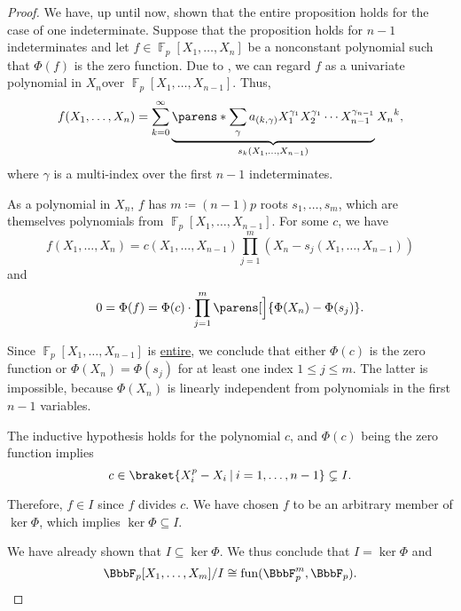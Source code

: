 \begin{proof}
  We have, up until now, shown that the entire proposition holds for the case of one indeterminate. Suppose that the proposition holds for \( n - 1 \) indeterminates and let \( f \in \BbbF_p[X_1, \ldots, X_n] \) be a nonconstant polynomial such that \( \Phi(f) \) is the zero function. Due to , we can regard \( f \) as a univariate polynomial in \( X_n \)over \( \BbbF_p[X_1, \ldots, X_{n-1}] \). Thus,
  \begin{equation*}
    f(X_1, \ldots, X_n) = \sum_{k =0}^\infty \underbrace{\parens*{ \sum_\gamma a_{(k,\gamma)} X_1^{\gamma_1} X_2^{\gamma_1} \cdots X_{n-1}^{\gamma_{n-1}} }}_{s_k(X_1, \ldots, X_{n-1})} {X_n}^k,
  \end{equation*}
  where \( \gamma \) is a multi-index over the first \( n - 1 \) indeterminates.

  As a polynomial in \( X_n \), \( f \) has \( m \coloneqq (n-1)p \) roots \( s_1, \ldots, s_m \), which are themselves polynomials from \( \BbbF_p[X_1, \ldots, X_{n-1}] \). For some \( c \), we have
  \begin{equation*}
    f(X_1, \ldots, X_n) = c(X_1, \ldots, X_{n-1}) \prod_{j=1}^m (X_n - s_j(X_1, \ldots, X_{n-1}))
  \end{equation*}
  and
  \begin{equation*}
    0 = \Phi(f) = \Phi(c) \cdot \prod_{j=1}^m \parens[\Big]{ \Phi(X_n) - \Phi(s_j) }.
  \end{equation*}

  Since \( \BbbF_p[X_1, \ldots, X_{n-1}] \) is \hyperref[def:entire_semiring]{entire}, we conclude that either \( \Phi(c) \) is the zero function or \( \Phi(X_n) = \Phi(s_j) \) for at least one index \( 1 \leq j \leq m \). The latter is impossible, because \( \Phi(X_n) \) is linearly independent from polynomials in the first \( n - 1 \) variables.

  The inductive hypothesis holds for the polynomial \( c \), and \( \Phi(c) \) being the zero function implies
  \begin{equation*}
    c \in \braket{ X_i^p - X_i \given i = 1, \ldots, n - 1 } \subsetneq I.
  \end{equation*}

  Therefore, \( f \in I \) since \( f \) divides \( c \). We have chosen \( f \) to be an arbitrary member of \( \ker \Phi \), which implies \( \ker \Phi \subseteq I \).

  We have already shown that \( I \subseteq \ker \Phi \). We thus conclude that \( I = \ker \Phi \) and
  \begin{equation*}
    \BbbF_p[X_1, \ldots, X_m] / I \cong \fun(\BbbF_p^m, \BbbF_p).
  \end{equation*}
\end{proof}

